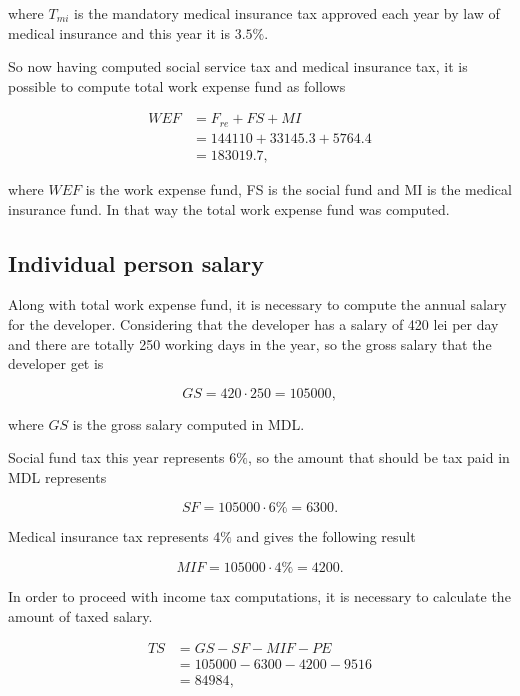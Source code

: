 \noindent
where $T_{mi}$ is the mandatory medical insurance tax approved each year by law of medical insurance and this year it is $3.5\%$. 

So now having computed social service tax and medical insurance tax, it is possible to compute total work expense fund as follows

\begin{equation}
\begin{split}
 WEF &= F_{re} + FS + MI\\ 
     &= 144110 + 33145.3 + 5764.4\\ 
     &= 183019.7,
\end{split}
\end{equation}

\noindent
where $WEF$ is the work expense fund, FS is the social fund and MI is the medical insurance fund. In that way the total work expense fund was computed. 

\subsection{Individual person salary}
Along with total work expense fund, it is necessary to compute the annual salary for the developer. Considering that the developer has a salary of 420 lei per day and there are totally 250 working days in the year, so the gross salary that the developer get is

\begin{equation}
 GS = 420 \cdot 250 = 105000,
\end{equation}

\noindent where $GS$ is the gross salary computed in MDL.

Social fund tax this year represents $6\%$, so the amount that should be tax paid in MDL represents

\begin{equation}
 SF = 105000 \cdot 6\% = 6300.
\end{equation}

Medical insurance tax represents $4\%$ and gives the following result

\begin{equation}
 MIF = 105000 \cdot 4\% = 4200.
\end{equation}

In order to proceed with income tax computations, it is necessary to calculate the amount of taxed salary.

\begin{equation}
\begin{split}
 TS &= GS - SF - MIF - PE \\
              &= 105000 - 6300 - 4200 - 9516\\ 
              &= 84984,
\end{split}
\end{equation}


